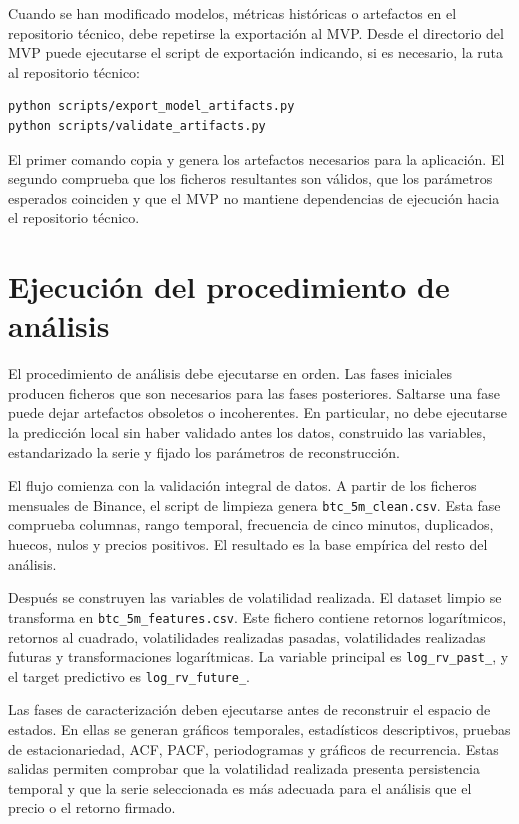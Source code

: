 Cuando se han modificado modelos, métricas históricas o artefactos en el repositorio técnico, debe repetirse la exportación al MVP. Desde el directorio del MVP puede ejecutarse el script de exportación indicando, si es necesario, la ruta al repositorio técnico:

\begin{verbatim}
python scripts/export_model_artifacts.py
python scripts/validate_artifacts.py
\end{verbatim}

El primer comando copia y genera los artefactos necesarios para la aplicación. El segundo comprueba que los ficheros resultantes son válidos, que los parámetros esperados coinciden y que el MVP no mantiene dependencias de ejecución hacia el repositorio técnico.

\section{Ejecución del procedimiento de análisis}\label{sec:ejecucion-procedimiento}

El procedimiento de análisis debe ejecutarse en orden. Las fases iniciales producen ficheros que son necesarios para las fases posteriores. Saltarse una fase puede dejar artefactos obsoletos o incoherentes. En particular, no debe ejecutarse la predicción local sin haber validado antes los datos, construido las variables, estandarizado la serie y fijado los parámetros de reconstrucción.

El flujo comienza con la validación integral de datos. A partir de los ficheros mensuales de Binance, el script de limpieza genera \texttt{btc\_\allowbreak 5m\_\allowbreak clean.csv}. Esta fase comprueba columnas, rango temporal, frecuencia de cinco minutos, duplicados, huecos, nulos y precios positivos. El resultado es la base empírica del resto del análisis.

Después se construyen las variables de volatilidad realizada. El dataset limpio se transforma en \texttt{btc\_\allowbreak 5m\_\allowbreak features.csv}. Este fichero contiene retornos logarítmicos, retornos al cuadrado, volatilidades realizadas pasadas, volatilidades realizadas futuras y transformaciones logarítmicas. La variable principal es \texttt{log\_\allowbreak rv\_\allowbreak past\_}, y el target predictivo es \texttt{log\_\allowbreak rv\_\allowbreak future\_}.

Las fases de caracterización deben ejecutarse antes de reconstruir el espacio de estados. En ellas se generan gráficos temporales, estadísticos descriptivos, pruebas de estacionariedad, ACF, PACF, periodogramas y gráficos de recurrencia. Estas salidas permiten comprobar que la volatilidad realizada presenta persistencia temporal y que la serie seleccionada es más adecuada para el análisis que el precio o el retorno firmado.

